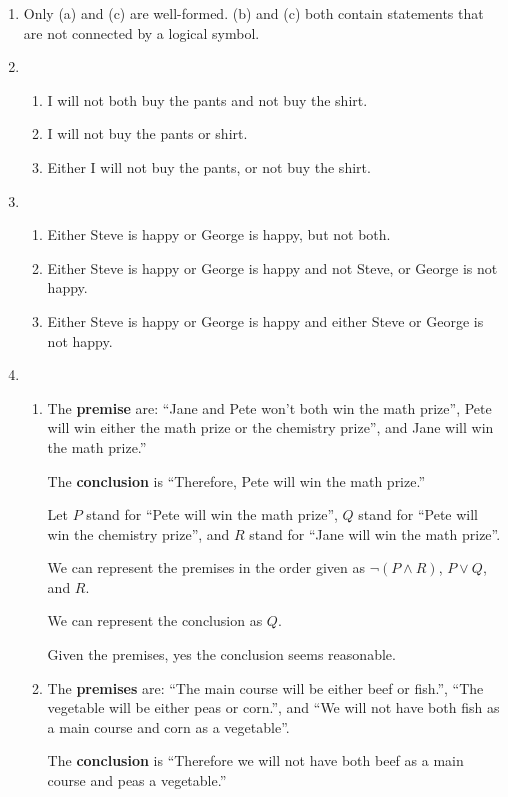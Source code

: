 \documentclass{article}
\begin{document}
\begin{enumerate}
\begin{enumerate}
  \end{enumerate}
\item Only (a) and (c) are well-formed.	 (b) and (c) both contain statements that are not connected by a logical symbol.
\item
  \begin{enumerate}
  \item I will not both buy the pants and not buy the shirt.
  \item I will not buy the pants or shirt.
  \item Either I will not buy the pants, or not buy the shirt.
  \end{enumerate}
\item
  \begin{enumerate}
  \item Either Steve is happy or George is happy, but not both.
  \item Either Steve is happy or George is happy and not Steve, or George is not happy.
  \item Either Steve is happy or George is happy and either Steve or George is not happy.
  \end{enumerate}
\item
  \begin{enumerate}
  \item The \textbf{premise} are: ``Jane and Pete won't both win the math prize'', Pete will win either the math prize or the chemistry prize'', and Jane will win the math prize.''

    The \textbf{conclusion} is ``Therefore, Pete will win the math prize.''

    Let $P$ stand for ``Pete will win the math prize'', $Q$ stand for ``Pete will win the chemistry prize'', and $R$ stand for ``Jane will win the math prize''.

    We can represent the premises in the order given as $\lnot (P \land R)$, $P \lor Q$, and $R$.

    We can represent the conclusion as $Q$.

    Given the premises, yes the conclusion seems reasonable.

  \item The \textbf{premises} are: ``The main course will be either beef or fish.'', ``The vegetable will be either peas or corn.'', and ``We will not have both fish as a main course and corn as a vegetable''.

    The \textbf{conclusion} is ``Therefore we will not have both beef as a main course and peas a vegetable.''


\end{enumerate}
\end{enumerate}
\end{document}
